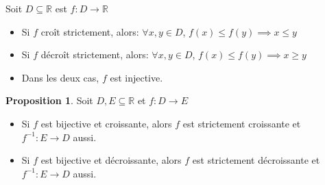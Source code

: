 \documentclass[10pt,a4paper]{article}
\theoremstyle{definition}
\newtheorem{proposition}{Proposition}[section]
\begin{document}
Soit $D \subseteq \mathbb{R}$ est $f: D \to \mathbb{R}$
\begin{itemize}
\item Si $f$ croît strictement, alors: $\forall x, y \in D$, $f(x) \leq f(y) \implies x \leq y$
\item Si $f$ décroît strictement, alors: $\forall x, y \in D$, $f(x) \leq f(y) \implies x \geq y$
\item Dans les deux cas, $f$ est injective.
\end{itemize}
\begin{proposition}
Soit $D, E \subseteq \mathbb{R}$ et $f: D \to E$
\begin{itemize}
\item Si $f$ est bijective et croissante, alors $f$ est strictement croissante et $f^{-1}: E \to D$ aussi.
\item Si $f$ est bijective et décroissante, alors $f$ est strictement décroissante et $f^{-1} : E \to D$ aussi.
\end{itemize}
\end{proposition}

\pagebreak
\end{document}
